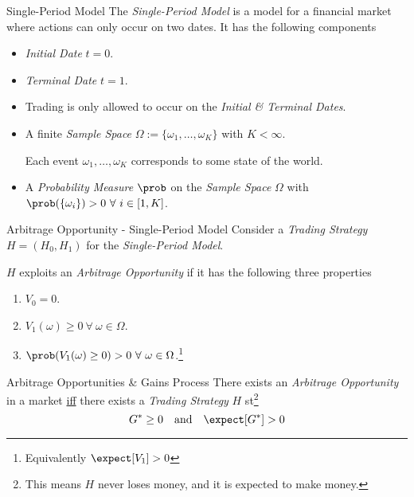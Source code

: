 \documentclass[11pt,a4paper]{article}
\begin{document}
  \begin{definition}{Single-Period Model}
    The \textit{Single-Period Model} is a model for a financial market where actions can only occur on two dates. It has the following components
    \begin{itemize}
      \item \textit{Initial Date} $t=0$.
      \item \textit{Terminal Date} $t=1$.
      \item Trading is only allowed to occur on the \textit{Initial \& Terminal Dates}.
      \item A finite \textit{Sample Space} $\Omega:=\{\omega_1,\dots,\omega_K\}$ with $K<\infty$.
      \par Each event $\omega_1,\dots,\omega_K$ corresponds to some state of the world.
      \item A \textit{Probability Measure} $\prob$ on the \textit{Sample Space} $\Omega$ with $\prob(\{\omega_i\})>0\ \forall\ i\in[1,K]$.
    \end{itemize}
  \end{definition}

  \begin{definition}{Arbitrage Opportunity - Single-Period Model}
    Consider a \textit{Trading Strategy} $H=(H_0,H_1)$ for the \textit{Single-Period Model}.
    \par $H$ exploits an \textit{Arbitrage Opportunity} if it has the following three properties
    \begin{enumerate}
      \item $V_0=0$.
      \item $V_1(\omega)\geq0\ \forall\ \omega\in\Omega$.
      \item $\prob(V_1(\omega)\geq0)>0\ \forall\ \omega\in\Omega$.\footnote{Equivalently $\expect[V_1]>0$}
    \end{enumerate}
  \end{definition}

  \begin{theorem}{Arbitrage Opportunities \& Gains Process}\label{the_arbitrage_opportunities_and_gains_processes}
    There exists an \textit{Arbitrage Opportunity} in a market \underline{iff} there exists a \textit{Trading Strategy} $H$ st\footnote{This means $H$ never loses money, and it is expected to make money.}
    \[ G^*\geq0\quad\text{and}\quad\expect[G^*]>0 \]
  \end{theorem}
\end{document}
